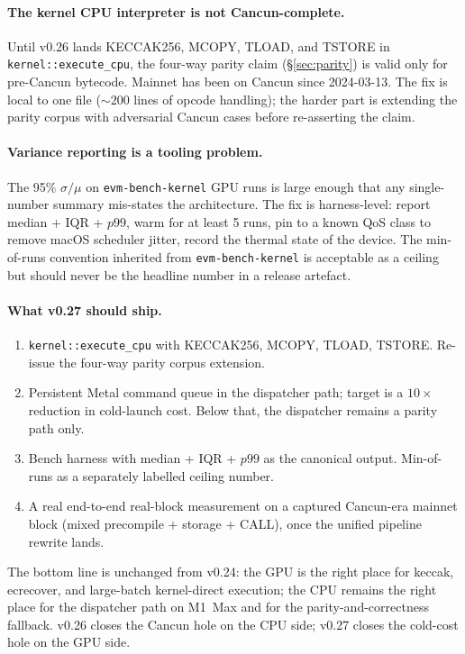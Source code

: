 \paragraph{The kernel CPU interpreter is not Cancun-complete.} Until
v0.26 lands KECCAK256, MCOPY, TLOAD, and TSTORE in
\texttt{kernel::execute\_cpu}, the four-way parity claim
(\S\ref{sec:parity}) is valid only for pre-Cancun bytecode. Mainnet
has been on Cancun since 2024-03-13. The fix is local to one file
($\sim 200$ lines of opcode handling); the harder part is extending
the parity corpus with adversarial Cancun cases before re-asserting
the claim.

\paragraph{Variance reporting is a tooling problem.} The 95\%
$\sigma/\mu$ on \texttt{evm-bench-kernel} GPU runs is large enough
that any single-number summary mis-states the architecture. The fix
is harness-level: report median + IQR + $p99$, warm for at least 5
runs, pin to a known QoS class to remove macOS scheduler jitter,
record the thermal state of the device. The min-of-runs convention
inherited from \texttt{evm-bench-kernel} is acceptable as a ceiling
but should never be the headline number in a release artefact.

\paragraph{What v0.27 should ship.}

\begin{enumerate}
  \item \texttt{kernel::execute\_cpu} with KECCAK256, MCOPY, TLOAD,
    TSTORE. Re-issue the four-way parity corpus extension.
  \item Persistent Metal command queue in the dispatcher path; target
    is a $10\times$ reduction in cold-launch cost. Below that, the
    dispatcher remains a parity path only.
  \item Bench harness with median + IQR + $p99$ as the canonical
    output. Min-of-runs as a separately labelled ceiling number.
  \item A real end-to-end real-block measurement on a captured
    Cancun-era mainnet block (mixed precompile + storage + CALL),
    once the unified pipeline rewrite lands.
\end{enumerate}

The bottom line is unchanged from v0.24: the GPU is the right place
for keccak, ecrecover, and large-batch kernel-direct execution; the
CPU remains the right place for the dispatcher path on M1~Max and
for the parity-and-correctness fallback. v0.26 closes the Cancun
hole on the CPU side; v0.27 closes the cold-cost hole on the GPU
side.

